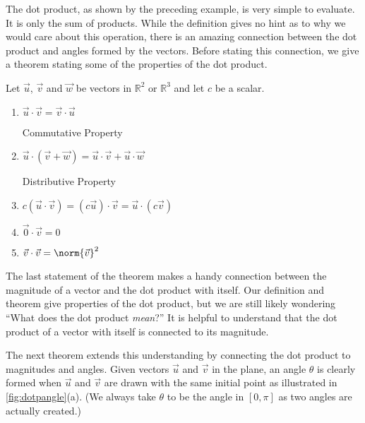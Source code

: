 The dot product, as shown by the preceding example, is very simple to evaluate. It is only the sum of products. While the definition gives no hint as to why we would care about this operation, there is an amazing connection between the dot product and angles formed by the vectors. Before stating this connection, we give a theorem stating some of the properties of the dot product.

\begin{theorem}\label{thm:dot_product_properties}%
Let $\vec u$, $\vec v$ and $\vec w$ be vectors in $\mathbb{R}^2$ or $\mathbb{R}^3$ and let $c$ be a scalar.
\begin{enumerate}
	\item \parbox{150pt}{$\vec u\cdot\vec v = \vec v\cdot\vec u$}{Commutative Property}
	\item \parbox{150pt}{$\vec u\cdot(\vec v+\vec w) = \vec u\cdot\vec v + \vec u\cdot\vec w$}{Distributive Property}
	\item	$c(\vec u\cdot\vec v) = (c\vec u)\cdot \vec v = \vec u \cdot (c\vec v)$
	\item	$\vec 0\cdot\vec v = 0$
	\item	$\vec v\cdot\vec v=\norm{\vec v}^2 $
\end{enumerate}
\end{theorem}

The last statement of the theorem makes a handy connection between the magnitude of a vector and the dot product with itself. Our definition and theorem give properties of the dot product, but we are still likely wondering ``What does the dot product \emph{mean}?'' It is helpful to understand that the dot product of a vector with itself is connected to its magnitude.

The next theorem extends this understanding by connecting the dot product to magnitudes and angles. Given vectors $\vec u$ and $\vec v$ in the plane, an angle $\theta$ is clearly formed when $\vec u$ and $\vec v$ are drawn with the same initial point as illustrated in \autoref{fig:dotpangle}(a). (We always take $\theta$ to be the angle in $[0,\pi]$ as two angles are actually created.) 


